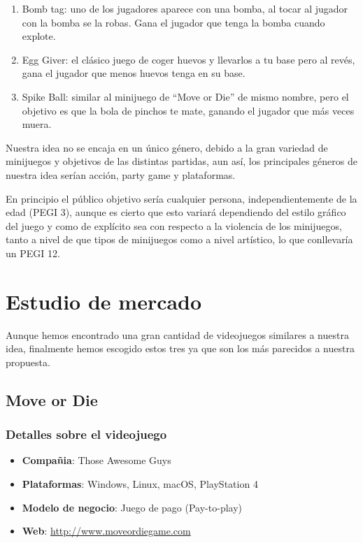 \documentclass[12pt, spanish]{article}
\begin{document}
\begin{enumerate}
	\item Bomb tag: uno de los jugadores aparece con una bomba, al tocar al jugador con la bomba se la robas. Gana el jugador que tenga la bomba cuando explote.
	\item Egg Giver: el clásico juego de coger huevos y llevarlos a tu base pero al revés, gana el jugador que menos huevos tenga en su base.
	\item Spike Ball: similar al minijuego de “Move or Die” de mismo nombre, pero el objetivo es que la bola de pinchos te mate, ganando el jugador que más veces muera.
\end{enumerate}


Nuestra idea no se encaja en un único género, debido a la gran variedad de minijuegos y objetivos de las distintas partidas, aun así, los principales géneros de nuestra idea serían acción, party game y plataformas.

En principio el público objetivo sería cualquier persona, independientemente de la edad (PEGI 3), aunque es cierto que esto variará dependiendo del estilo gráfico del juego y como de explícito sea con respecto a la violencia de los minijuegos, tanto a nivel de que tipos de minijuegos como a nivel artístico, lo que conllevaría un PEGI 12.

\section{Estudio de mercado}

Aunque hemos encontrado una gran cantidad de videojuegos similares a nuestra idea, finalmente hemos escogido estos tres ya que son los más parecidos a nuestra propuesta.

\subsection{Move or Die}

\subsubsection{Detalles sobre el videojuego}

\begin{itemize}
	\item \textbf{Compañia}: Those Awesome Guys
	\item \textbf{Plataformas}: Windows, Linux, macOS, PlayStation 4
	\item \textbf{Modelo de negocio}: Juego de pago (Pay-to-play)
	\item \textbf{Web}: \url{http://www.moveordiegame.com}
\end{itemize}
\end{document}
